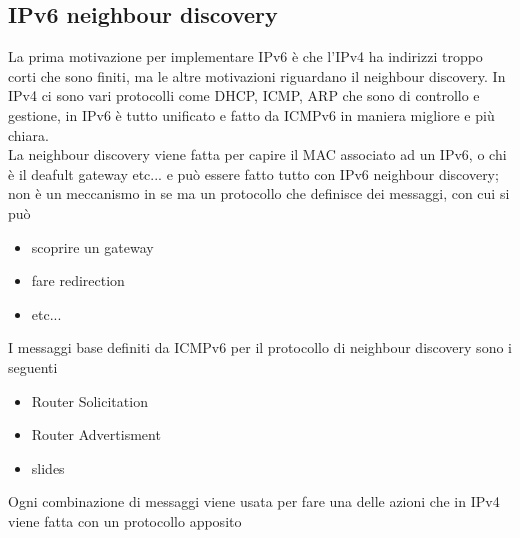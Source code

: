 \documentclass[12pt, oneside]{extbook} %
\begin{document}
\subsection{IPv6 neighbour discovery}
La prima motivazione per implementare IPv6 è che l'IPv4 ha indirizzi troppo corti che sono finiti, ma le altre motivazioni riguardano il neighbour discovery. In IPv4 ci sono vari protocolli come DHCP, ICMP, ARP che sono di controllo e gestione, in IPv6 è tutto unificato e fatto da ICMPv6 in maniera migliore e più chiara.\\ La neighbour discovery viene fatta per capire il MAC associato ad un IPv6, o chi è il deafult gateway etc... e può essere fatto tutto con IPv6 neighbour discovery; non è un meccanismo in se ma un protocollo che definisce dei messaggi, con cui si può
\begin{itemize}
\item scoprire un gateway
\item fare redirection
\item etc...
\end{itemize}
I messaggi base definiti da ICMPv6 per il protocollo di neighbour discovery sono i seguenti
\begin{itemize}
\item Router Solicitation
\item Router Advertisment
\item slides 
\end{itemize}
Ogni combinazione di messaggi viene usata per fare una delle azioni che in IPv4 viene fatta con un protocollo apposito
\end{document}
